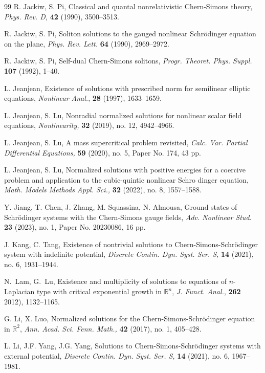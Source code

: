 \documentclass[11pt]{amsart}
\numberwithin{equation}{section}
\theoremstyle{definition}
\newcommand{\R}{\mathbb{R}}
\begin{document}
\begin{thebibliography}{99}
R. Jackiw, S. Pi, Classical and quantal nonrelativistic Chern-Simons theory, {\it Phys. Rev. D,} {\bf42} (1990), 3500--3513.

R. Jackiw, S. Pi, Soliton solutions to the gauged nonlinear Schr\"{o}dinger equation on the plane,
{\it Phys. Rev. Lett.} {\bf64}
(1990), 2969--2972.

R. Jackiw, S. Pi, Self-dual Chern-Simons solitons, {\it Progr. Theoret. Phys. Suppl.} {\bf107} (1992), 1--40.

L. Jeanjean, Existence of solutions with prescribed norm for semilinear elliptic equations, \textit{Nonlinear Anal.}, \textbf{28} (1997), 1633--1659.

L. Jeanjean, S. Lu, Nonradial normalized solutions for nonlinear scalar field equations, {\it Nonlinearity,}
 {\bf 32} (2019), no. 12, 4942--4966.

L. Jeanjean, S. Lu, A mass supercritical problem revisited,
{\it Calc. Var. Partial Differential Equations,} {\bf59} (2020), no. 5, Paper No. 174, 43 pp.

L. Jeanjean, S. Lu, Normalized solutions with positive energies for a coercive problem and application to the cubic-quintic nonlinear Schro
 dinger equation, {\it Math. Models Methods Appl. Sci.,} {\bf32} (2022), no. 8, 1557--1588.

 Y. Jiang, T. Chen, J. Zhang, M. Squassina, N. Almousa, Ground states of Schr\"{o}dinger systems with the Chern-Simons gauge fields,
 {\it Adv. Nonlinear Stud.} {\bf23} (2023), no. 1, Paper No. 20230086, 16 pp.


J. Kang, C. Tang, Existence of nontrivial solutions to Chern-Simons-Schr\"{o}dinger system with indefinite potential,
{\it Discrete Contin. Dyn. Syst. Ser. S,} {\bf14} (2021), no. 6, 1931--1944.

N.~Lam, G.~Lu, Existence and multiplicity of solutions to equations of $n$-Laplacian type with critical exponential growth in $\mathbb{R}^n$,
 \textit{J. Funct. Anal.}, \textbf{262} 2012), 1132--1165.

G. Li, X. Luo, Normalized solutions for the Chern-Simons-Schr\"{o}dinger equation in $\R^2$,
{\it Ann. Acad. Sci. Fenn. Math.,} {\bf42} (2017), no. 1, 405--428.

L. Li, J.F. Yang, J.G. Yang, Solutions to Chern-Simons-Schr\"{o}dinger systems with external potential,
{\it Discrete Contin. Dyn. Syst. Ser. S,} {\bf14} (2021), no. 6, 1967--1981.


\end{thebibliography}
\end{document}
